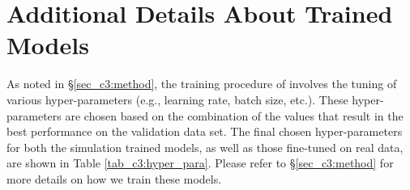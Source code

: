 
\section{Additional Details About Trained \gampen{} Models}\label{ap:sec_c3:trained_models}

As noted in \S \ref{sec_c3:method}, the training procedure of \gampen{} involves the tuning of various hyper-parameters (e.g., learning rate, batch size, etc.). These hyper-parameters are chosen based on the combination of the values that result in the best performance on the validation data set. The final chosen hyper-parameters for both the simulation trained \gampen{} models, as well as those fine-tuned on real data, are shown in Table \ref{tab_c3:hyper_para}. Please refer to \S \ref{sec_c3:method} for more details on how we train these models.


